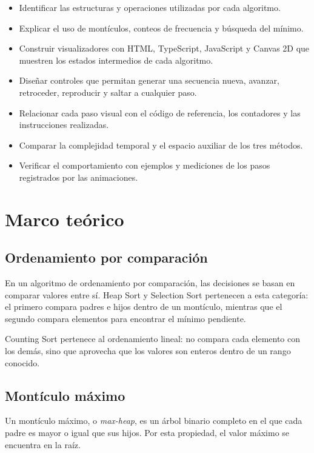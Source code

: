 \documentclass[12pt,a4paper]{article}
\begin{document}
\begin{itemize}
    \item Identificar las estructuras y operaciones utilizadas por cada algoritmo.
    \item Explicar el uso de montículos, conteos de frecuencia y búsqueda del mínimo.
    \item Construir visualizadores con HTML, TypeScript, JavaScript y Canvas 2D que muestren los estados intermedios de cada algoritmo.
    \item Diseñar controles que permitan generar una secuencia nueva, avanzar, retroceder, reproducir y saltar a cualquier paso.
    \item Relacionar cada paso visual con el código de referencia, los contadores y las instrucciones realizadas.
    \item Comparar la complejidad temporal y el espacio auxiliar de los tres métodos.
    \item Verificar el comportamiento con ejemplos y mediciones de los pasos registrados por las animaciones.
\end{itemize}

\section{Marco teórico}

\subsection{Ordenamiento por comparación}

En un algoritmo de ordenamiento por comparación, las decisiones se basan en comparar valores entre sí. Heap Sort y Selection Sort pertenecen a esta categoría: el primero compara padres e hijos dentro de un montículo, mientras que el segundo compara elementos para encontrar el mínimo pendiente.

Counting Sort pertenece al ordenamiento lineal: no compara cada elemento con los demás, sino que aprovecha que los valores son enteros dentro de un rango conocido.

\subsection{Montículo máximo}

Un montículo máximo, o \textit{max-heap}, es un árbol binario completo en el que cada padre es mayor o igual que sus hijos. Por esta propiedad, el valor máximo se encuentra en la raíz.
\end{document}
